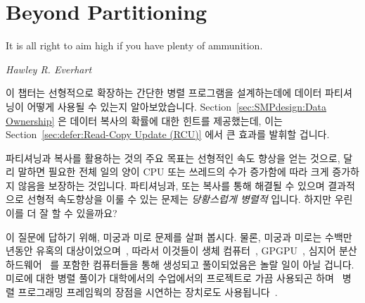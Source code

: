 
\section{Beyond Partitioning}
\label{sec:SMPdesign:Beyond Partitioning}
%
\epigraph{It is all right to aim high if you have plenty of ammunition.}
	 {\emph{Hawley R. Everhart}}

이 챕터는 선형적으로 확장하는 간단한 병렬 프로그램을 설계하는데에 데이터
파티셔닝이 어떻게 사용될 수 있는지 알아보았습니다.
Section~\ref{sec:SMPdesign:Data Ownership} 은 데이터 복사의 확률에 대한 힌트를
제공했는데, 이는 Section~\ref{sec:defer:Read-Copy Update (RCU)} 에서 큰 효과를
발휘할 겁니다.

파티셔닝과 복사를 활용하는 것의 주요 목표는 선형적인 속도 향상을 얻는 것으로,
달리 말하면 필요한 전체 일의 양이 CPU 또는 쓰레드의 수가 증가함에 따라 크게
증가하지 않음을 보장하는 것입니다.
파티셔닝과, 또는 복사를 통해 해결될 수 있으며 결과적으로 선형적 속도향상을 이룰
수 있는 문제는 \emph{당황스럽게 병렬적} 입니다.
하지만 우린 이를 더 잘 할 수 있을까요?

이 질문에 답하기 위해, 미궁과 미로 문제를 살펴 봅시다.
물론, 미궁과 미로는 수백만년동안 유혹의 대상이었으며~\cite{WikipediaLabyrinth},
따라서 이것들이 생체 컴퓨터~\cite{AndrewAdamatzky2011SlimeMold},
GPGPU~\cite{ChristerEricson2008GPUMaze}, 심지어 분산
하드웨어~\cite{MIT:TRMag:MemristorMazes} 를 포함한 컴퓨터들을 통해 생성되고
풀이되었음은 놀랄 일이 아닐 겁니다.
미로에 대한 병렬 풀이가 대학에서의 수업에서의 프로젝트로 가끔 사용되곤
하며~\cite{ETHZurich:FS2011maze,UMD:CMSC433maze} 병렬 프로그래밍 프레임웍의
장점을 시연하는 장치로도 사용됩니다~\cite{RonFosner2010maze}.

